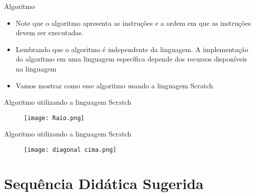 \documentclass{beamer}
\begin{document}
\begin{frame}{Algoritmo}

\begin{itemize}
    \item Note que o algoritmo apresenta as instruções e a ordem em que as instruções devem ser executadas.
   
   \item Lembrando que o algoritmo é independente da linguagem. A implementação do algoritmo em uma linguagem específica depende dos recursos disponíveis na linguagem
   
   \item Vamos mostrar como esse algoritmo usando a linguagem Scratch
   
   
    

    
    
\end{itemize}

\end{frame}







\begin{frame}[fragile]{Algoritmo utilizando a linguagem Scratch}

\begin{figure}
\begin{center}
	\texttt{[image: Raio.png]} 
\end{center}
\end{figure}

\end{frame}


\begin{frame}[fragile]{Algoritmo utilizando a linguagem Scratch}

\begin{figure}
\begin{center}
	\texttt{[image: diagonal cima.png]} 
\end{center}
\end{figure}

\end{frame}




\section{Sequência Didática Sugerida}
\end{document}
